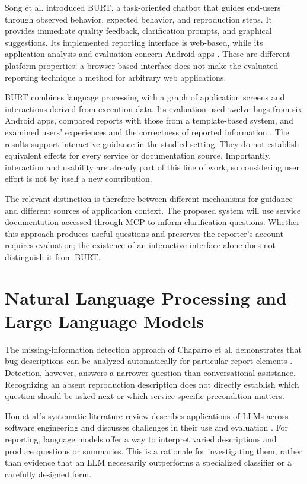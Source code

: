 Song et al. introduced BURT, a task-oriented chatbot that guides end-users through observed behavior, expected behavior, and reproduction steps. It provides immediate quality feedback, clarification prompts, and graphical suggestions. Its implemented reporting interface is web-based, while its application analysis and evaluation concern Android apps \cite{song2022}. These are different platform properties: a browser-based interface does not make the evaluated reporting technique a method for arbitrary web applications.

BURT combines language processing with a graph of application screens and interactions derived from execution data. Its evaluation used twelve bugs from six Android apps, compared reports with those from a template-based system, and examined users' experiences and the correctness of reported information \cite{song2022}. The results support interactive guidance in the studied setting. They do not establish equivalent effects for every service or documentation source. Importantly, interaction and usability are already part of this line of work, so considering user effort is not by itself a new contribution.

The relevant distinction is therefore between different mechanisms for guidance and different sources of application context. The proposed system will use service documentation accessed through MCP to inform clarification questions. Whether this approach produces useful questions and preserves the reporter's account requires evaluation; the existence of an interactive interface alone does not distinguish it from BURT.

\section{Natural Language Processing and Large Language Models}

The missing-information detection approach of Chaparro et al. demonstrates that bug descriptions can be analyzed automatically for particular report elements \cite{chaparro2017}. Detection, however, answers a narrower question than conversational assistance. Recognizing an absent reproduction description does not directly establish which question should be asked next or which service-specific precondition matters.

Hou et al.'s systematic literature review describes applications of LLMs across software engineering and discusses challenges in their use and evaluation \cite{hou2024}. For reporting, language models offer a way to interpret varied descriptions and produce questions or summaries. This is a rationale for investigating them, rather than evidence that an LLM necessarily outperforms a specialized classifier or a carefully designed form.

